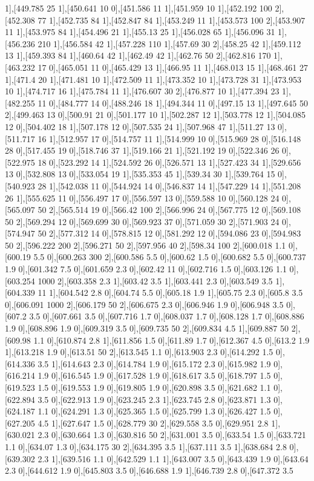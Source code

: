{1],[449.785 25 1],[450.641 10 0],[451.586 11 1],[451.959 10 1],[452.192 100 2],[452.308 77 1],[452.735 84 1],[452.847 84 1],[453.249 11 1],[453.573 100 2],[453.907 11 1],[453.975 84 1],[454.496 21 1],[455.13 25 1],[456.028 65 1],[456.096 31 1],[456.236 210 1],[456.584 42 1],[457.228 110 1],[457.69 30 2],[458.25 42 1],[459.112 13 1],[459.393 84 1],[460.64 42 1],[462.49 42 1],[462.76 50 2],[462.816 170 1],[463.232 17 0],[465.051 11 0],[465.429 13 1],[466.95 11 1],[468.013 15 1],[468.461 27 1],[471.4 20 1],[471.481 10 1],[472.509 11 1],[473.352 10 1],[473.728 31 1],[473.953 10 1],[474.717 16 1],[475.784 11 1],[476.607 30 2],[476.877 10 1],[477.394 23 1],[482.255 11 0],[484.777 14 0],[488.246 18 1],[494.344 11 0],[497.15 13 1],[497.645 50 2],[499.463 13 0],[500.91 21 0],[501.177 10 1],[502.287 12 1],[503.778 12 1],[504.085 12 0],[504.402 18 1],[507.178 12 0],[507.535 24 1],[507.968 47 1],[511.27 13 0],[511.717 16 1],[512.957 17 0],[514.757 11 1],[514.999 10 0],[515.969 28 0],[516.148 28 0],[517.455 19 0],[518.746 37 1],[519.166 21 1],[521.192 19 0],[522.346 26 0],[522.975 18 0],[523.292 14 1],[524.592 26 0],[526.571 13 1],[527.423 34 1],[529.656 13 0],[532.808 13 0],[533.054 19 1],[535.353 45 1],[539.34 30 1],[539.764 15 0],[540.923 28 1],[542.038 11 0],[544.924 14 0],[546.837 14 1],[547.229 14 1],[551.208 26 1],[555.625 11 0],[556.497 17 0],[556.597 13 0],[559.588 10 0],[560.128 24 0],[565.097 50 2],[565.514 19 0],[566.42 100 2],[566.996 24 0],[567.775 12 0],[569.108 50 2],[569.294 12 0],[569.699 30 0],[569.923 37 0],[571.059 30 2],[571.903 24 0],[574.947 50 2],[577.312 14 0],[578.815 12 0],[581.292 12 0],[594.086 23 0],[594.983 50 2],[596.222 200 2],[596.271 50 2],[597.956 40 2],[598.34 100 2],[600.018 1.1 0],[600.19 5.5 0],[600.263 300 2],[600.586 5.5 0],[600.62 1.5 0],[600.682 5.5 0],[600.737 1.9 0],[601.342 7.5 0],[601.659 2.3 0],[602.42 11 0],[602.716 1.5 0],[603.126 1.1 0],[603.254 1000 2],[603.358 2.3 1],[603.42 3.5 1],[603.441 2.3 0],[603.549 3.5 1],[604.339 11 1],[604.542 2.8 0],[604.74 5.5 0],[605.18 1.9 1],[605.75 2.3 0],[605.8 3.5 0],[606.091 1000 2],[606.179 50 2],[606.675 2.3 0],[606.946 1.9 0],[606.948 3.5 0],[607.2 3.5 0],[607.661 3.5 0],[607.716 1.7 0],[608.037 1.7 0],[608.128 1.7 0],[608.886 1.9 0],[608.896 1.9 0],[609.319 3.5 0],[609.735 50 2],[609.834 4.5 1],[609.887 50 2],[609.98 1.1 0],[610.874 2.8 1],[611.856 1.5 0],[611.89 1.7 0],[612.367 4.5 0],[613.2 1.9 1],[613.218 1.9 0],[613.51 50 2],[613.545 1.1 0],[613.903 2.3 0],[614.292 1.5 0],[614.336 3.5 1],[614.643 2.3 0],[614.784 1.9 0],[615.172 2.3 0],[615.982 1.9 0],[616.214 1.9 0],[616.545 1.9 0],[617.528 1.9 0],[618.617 3.5 0],[618.797 1.5 0],[619.523 1.5 0],[619.553 1.9 0],[619.805 1.9 0],[620.898 3.5 0],[621.682 1.1 0],[622.894 3.5 0],[622.913 1.9 0],[623.245 2.3 1],[623.745 2.8 0],[623.871 1.3 0],[624.187 1.1 0],[624.291 1.3 0],[625.365 1.5 0],[625.799 1.3 0],[626.427 1.5 0],[627.205 4.5 1],[627.647 1.5 0],[628.779 30 2],[629.558 3.5 0],[629.951 2.8 1],[630.021 2.3 0],[630.664 1.3 0],[630.816 50 2],[631.001 3.5 0],[633.54 1.5 0],[633.721 1.1 0],[634.07 1.3 0],[634.175 30 2],[634.395 3.5 1],[637.111 3.5 1],[638.684 2.8 0],[639.302 2.3 1],[639.516 1.1 0],[642.529 1.1 1],[643.007 3.5 0],[643.439 1.9 0],[643.64 2.3 0],[644.612 1.9 0],[645.803 3.5 0],[646.688 1.9 1],[646.739 2.8 0],[647.372 3.5 }
